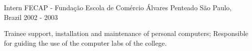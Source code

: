 \begin{cventries}
  \cventry
    {Intern} %
    {FECAP - Fundação Escola de Comércio Álvares Penteado} %
    {São Paulo, Brazil} %
    {2002 - 2003} %
    {
      \begin{cvitems} %
        \item {Trainee support, installation and maintenance of personal computers; 
        Responsible for guiding the use of the computer labs of the college.}
      \end{cvitems}
    }

\end{cventries}
